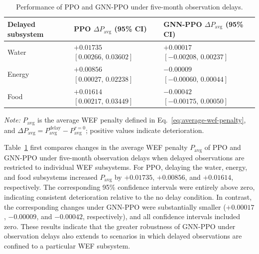 \documentclass [a4paper,fleqn] {cas-dc}
\begin{document}
\begin{table}[pos=ht]
\centering
\caption{Performance of PPO and GNN-PPO under five-month observation delays.}
\label{tab:sensitivity}
\footnotesize
\setlength{\tabcolsep}{2pt}
\renewcommand{\arraystretch}{1.12}
\begin{tabularx}{\columnwidth}{@{}>{\raggedright\arraybackslash}X
  >{\centering\arraybackslash}m{}
  >{\centering\arraybackslash}m{}@{}}
\toprule
Delayed subsystem 
& \shortstack{PPO $\Delta P_{\mathrm{avg}}$\\(95\% CI)}
& \shortstack{GNN-PPO $\Delta P_{\mathrm{avg}}$\\(95\% CI)} \\
\midrule

Water
& \shortstack{$+0.01735$\\$[0.00266,\,0.03602]$}
& \shortstack{$+0.00017$\\$[-0.00208,\,0.00237]$} \\

Energy 
& \shortstack{$+0.00856$\\$[0.00027,\,0.02238]$}
& \shortstack{$-0.00009$\\$[-0.00060,\,0.00044]$} \\

Food 
& \shortstack{$+0.01614$\\$[0.00217,\,0.03449]$}
& \shortstack{$-0.00042$\\$[-0.00175,\,0.00050]$} \\


\bottomrule
\end{tabularx}

\par\vspace{2pt}
\begin{minipage}{\columnwidth}
\raggedright
\textit{Note:} $P_{\mathrm{avg}}$ is the average WEF penalty defined in Eq.~\eqref{eq:average-wef-penalty}, and $\Delta P_{\mathrm{avg}}=P_{\mathrm{avg}}^{\mathrm{delay}}-P_{\mathrm{avg}}^{\tau=0}$; positive values indicate deterioration.
\end{minipage}
\end{table}

Table~\ref{tab:sensitivity} first compares changes in the average WEF penalty $P_{\mathrm{avg}}$ of PPO and GNN-PPO under five-month observation delays when delayed observations are restricted to individual WEF subsystems. For PPO, delaying the water, energy, and food subsystems increased $P_{\mathrm{avg}}$ by $+0.01735$, $+0.00856$, and $+0.01614$, respectively. The corresponding 95\% confidence intervals were entirely above zero, indicating consistent deterioration relative to the no delay condition. In contrast, the corresponding changes under GNN-PPO were substantially smaller ($+0.00017$, $-0.00009$, and $-0.00042$, respectively), and all confidence intervals included zero. These results indicate that the greater robustness of GNN-PPO under observation delays also extends to scenarios in which delayed observations are confined to a particular WEF subsystem.
\end{document}
